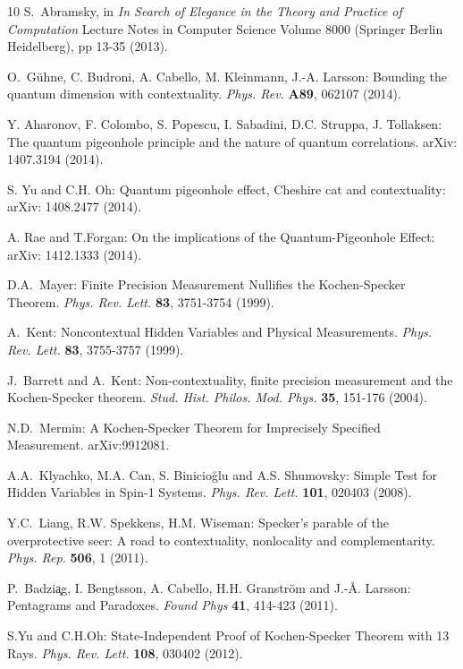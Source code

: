 \begin{thebibliography}{10}
S.~Abramsky, in {\it In Search of Elegance in the Theory and Practice of Computation} Lecture Notes in Computer Science Volume 8000 (Springer Berlin Heidelberg), pp 13-35 (2013).

O.~G{\"u}hne, C. Budroni, A. Cabello, M. Kleinmann, J.-A. Larsson: Bounding the quantum dimension with contextuality. {\it  Phys. Rev.} {\bf A89}, 062107 (2014).

Y. Aharonov, F. Colombo, S. Popescu, I. Sabadini, D.C. Struppa, J. Tollaksen: The quantum pigeonhole principle and the nature of quantum correlations. arXiv: 1407.3194 (2014).

S. Yu and C.H. Oh: Quantum pigeonhole effect, Cheshire cat and contextuality: arXiv: 1408.2477 (2014).

A. Rae and T.Forgan: On the implications of the Quantum-Pigeonhole Effect: arXiv: 1412.1333 (2014).

D.A.~Mayer: Finite Precision Measurement Nullifies the Kochen-Specker Theorem. {\it Phys. Rev. Lett.} \textbf{{\bf 83}}, 3751-3754 (1999).

A.~Kent: Noncontextual Hidden Variables and Physical Measurements. {\it Phys. Rev. Lett.} \textbf{{\bf 83}}, 3755-3757 (1999).

J.~Barrett and A.~Kent: Non-contextuality, finite precision measurement and the Kochen-Specker theorem. {\it Stud. Hist. Philos. Mod. Phys.} \textbf{{\bf 35}}, 151-176 (2004).

N.D.~Mermin: A Kochen-Specker Theorem for Imprecisely Specified Measurement. arXiv:9912081.

A.A.~Klyachko, M.A. Can, S. Binicio\u{g}lu and A.S. Shumovsky: Simple Test for Hidden Variables in Spin-1 Systems. {\it Phys. Rev. Lett.}
  \textbf{{\bf 101}}, 020403 (2008).

Y.C.~Liang, R.W. Spekkens, H.M. Wiseman: Specker's parable of the overprotective seer: A road to contextuality, nonlocality and complementarity. {\it Phys. Rep.} \textbf{{\bf 506}}, 1 (2011).

P.~Badzi{\c a}g, I. Bengtsson, A. Cabello, H.H. Granstr\"om and J.-\AA. Larsson: Pentagrams and Paradoxes. {\it Found Phys}
  \textbf{{\bf 41}}, 414-423 (2011).

S.Yu and C.H.Oh: State-Independent Proof of Kochen-Specker Theorem with 13 Rays. {\it Phys. Rev. Lett.} \textbf{{\bf 108}}, 030402 (2012).


\end{thebibliography}
